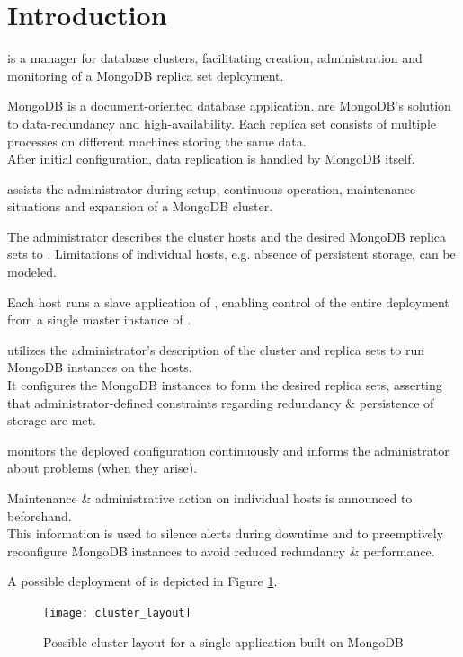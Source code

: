 \documentclass[a4paper, 11pt]{article}
\let\oldsection\section
\renewcommand\section{\clearpage\oldsection}
\begin{document}
\section{Introduction}
\mamid is a manager for database \glspl{cluster}, facilitating creation, administration and monitoring of a \gls{MongoDB} \gls{replica set} deployment.

\gls{MongoDB} is a document-oriented database application.  are MongoDB's solution to data-redundancy and high-availability. Each replica set consists of multiple processes on different machines storing the same data.\\
After initial configuration, data replication is handled by MongoDB itself.

\mamid assists the \gls{administrator} during setup, continuous operation, maintenance situations and expansion of a \gls{MongoDB} cluster.

The \gls{administrator} describes the cluster \glspl{host} and the desired \gls{MongoDB} \glspl{replica set} to \mamid.
Limitations of individual hosts, e.g. absence of persistent storage, can be modeled.

Each \gls{host} runs a \gls{slave} application of \mamid, enabling control of the entire deployment from a single \gls{master} instance of \mamid.

\mamid utilizes the \gls{administrator}'s description of the cluster and replica sets to run \gls{MongoDB} instances on the \glspl{host}.\\
It configures the \gls{MongoDB} instances to form the desired replica sets, asserting that administrator-defined constraints regarding redundancy \& persistence of storage are met.

\mamid monitors the deployed configuration continuously and informs the \gls{administrator} about problems (when they arise).

Maintenance \& administrative action on individual hosts is announced to \mamid beforehand.\\
This information is used to silence alerts during downtime and to preemptively reconfigure MongoDB instances to avoid reduced redundancy \& performance.

A possible deployment of \mamid is depicted in Figure \ref{fig:cluster_layout}.

\begin{figure}[H]
	\centering
	\texttt{[image: cluster\_layout]} %
	\caption{Possible cluster layout for a single application built on MongoDB}
	\label{fig:cluster_layout}
\end{figure}
\end{document}
